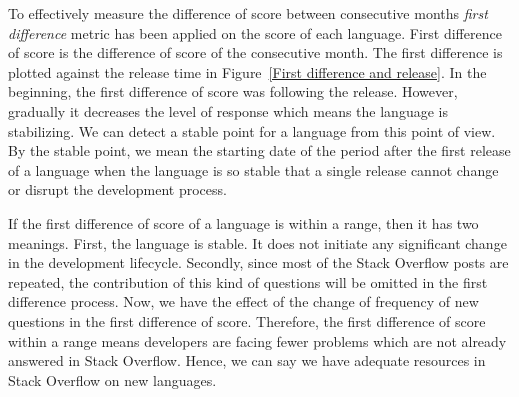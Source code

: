To effectively measure the difference of score between consecutive months \emph{first difference} metric \citep{Rasheed2011} has been applied on the score of each language. First difference of score is the difference of score of the consecutive month. The first difference is plotted against the release time in Figure~\ref{First difference and release}. In the beginning, the first difference of score was following the release. However, gradually it decreases the level of response which means the language is stabilizing. We can detect a stable point for a language from this point of view. By the stable point, we mean the starting date of the period after the first release of a language when the language is so stable that a single release cannot change or disrupt the development process.

If the first difference of score of a language is within a range, then it has two meanings. First, the language is stable. It does not initiate any significant change in the development lifecycle. Secondly, since most of the Stack Overflow posts are repeated, the contribution of this kind of questions will be omitted in the first difference process. Now, we have the effect of the change of frequency of new questions in the first difference of score. Therefore, the first difference of score within a range means developers are facing fewer problems which are not already answered in Stack Overflow. Hence, we can say we have adequate resources in Stack Overflow on new languages.


